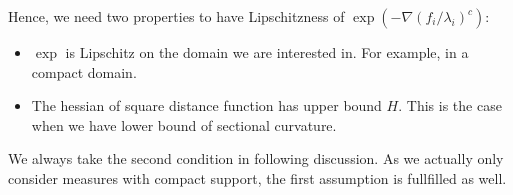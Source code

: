 Hence, we need two properties to have Lipschitzness of $\exp(-\nabla (f_i / \lambda_i)^c)$:
\begin{itemize}
	\item $ \exp $ is Lipschitz on the domain we are interested in.
	      For example, in a compact domain.
	\item The hessian of square distance function has upper bound $H$.
	      This is the case when we have lower bound of sectional curvature.
\end{itemize}

We always take the second condition in following discussion.
As we actually only consider measures with compact support, the first assumption is fullfilled as well.

